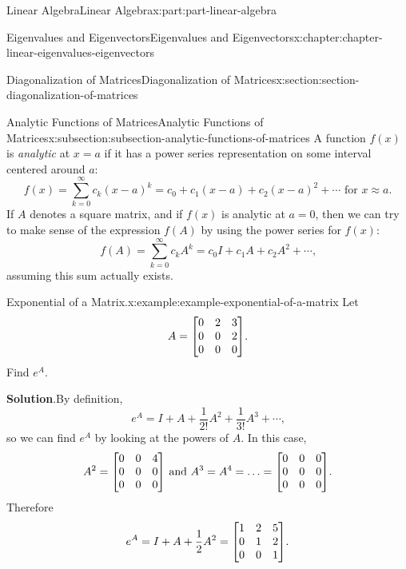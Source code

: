 \documentclass[twoside,10pt,]{book}
\newcommand{\blocktitlefont}{\relax}
\numberwithin{equation}{part}
\begin{document}
\begin{partptx}{Linear Algebra}{}{Linear Algebra}{}{}{x:part:part-linear-algebra}
\begin{chapterptx}{Eigenvalues and Eigenvectors}{}{Eigenvalues and Eigenvectors}{}{}{x:chapter:chapter-linear-eigenvalues-eigenvectors}
\begin{sectionptx}{Diagonalization of Matrices}{}{Diagonalization of Matrices}{}{}{x:section:section-diagonalization-of-matrices}
%
%
\typeout{************************************************}
\typeout{************************************************}
%
\begin{subsectionptx}{Analytic Functions of Matrices}{}{Analytic Functions of Matrices}{}{}{x:subsection:subsection-analytic-functions-of-matrices}
A function \(f(x)\) is \emph{analytic} at \(x = a\) if it has a power series representation on some interval centered around \(a\):%
\begin{equation*}
f(x) = \sum_{k=0}^\infty c_k(x-a)^k = c_0 + c_1(x-a) + c_2(x-a)^2 + \cdots\text{ for }x\approx a\text{.}
\end{equation*}
If \(A\) denotes a square matrix, and if \(f(x)\) is analytic at \(a=0\), then we can try to make sense of the expression \(f(A)\) by using the power series for \(f(x)\):%
\begin{equation*}
f(A) = \sum_{k=0}^{\infty}c_k A^k = c_0I + c_1A + c_2A^2 + \cdots\text{,}
\end{equation*}
assuming this sum actually exists.%
\begin{example}{Exponential of a Matrix.}{x:example:example-exponential-of-a-matrix}%
Let%
\begin{equation*}
A = \mqty[0 & 2 & 3 \\ 0 & 0 & 2 \\ 0 & 0 & 0]\text{.}
\end{equation*}
Find \(e^A\).%
\par\smallskip%
\noindent\textbf{\blocktitlefont Solution}.\hypertarget{g:solution:idm1630489912}{}\quad{}By definition,%
\begin{equation*}
e^A = I + A + \frac{1}{2!}A^2 + \frac{1}{3!}A^3 + \cdots\text{,}
\end{equation*}
so we can find \(e^A\) by looking at the powers of \(A\). In this case,%
\begin{equation*}
A^2 = \mqty[0 & 0 & 4 \\ 0 & 0 & 0 \\ 0 & 0 & 0]\text{ and }A^3 = A^4 = \ldots = \mqty[0 & 0 & 0 \\ 0 & 0 & 0 \\ 0 & 0 & 0]\text{.}
\end{equation*}
Therefore%
\begin{equation*}
e^A = I + A + \frac{1}{2}A^2 = \mqty[1 & 2 & 5 \\ 0 & 1 & 2 \\ 0 & 0 & 1]\text{.}
\end{equation*}

\end{example}
\end{subsectionptx}
\end{sectionptx}
\end{chapterptx}
\end{partptx}
\end{document}
